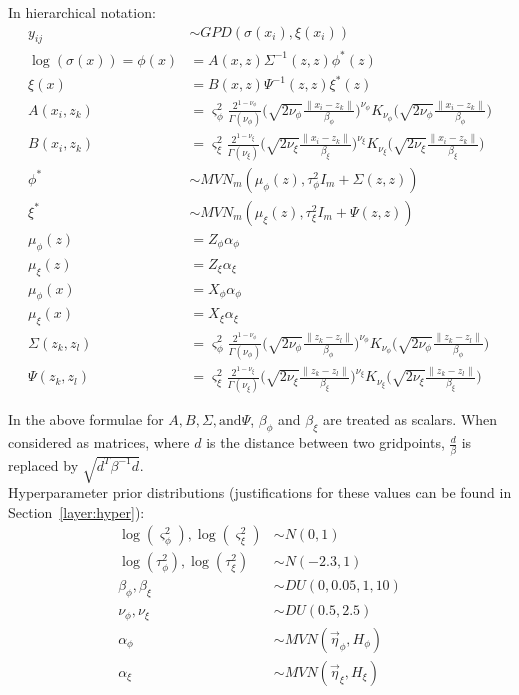 \documentclass{article}
\begin{document}
In hierarchical notation:
\begin{align*}
y_{ij} &\sim GPD(\sigma(x_i), \xi(x_i)) \\
\log (\sigma (x)) = \phi(x) &= A(x, z) \Sigma^{-1}(z,z) \phi^*(z) \\
\xi (x) &= B(x, z) \Psi^{-1}(z,z) \xi^*(z) \\
A(x_i, z_k) &= \varsigma_\phi^2 \frac{2^{1-\nu_\phi}}{\Gamma(\nu_\phi)}\Bigg(\sqrt{2\nu_\phi}\frac{\|x_i - z_k\|}{\beta_\phi}\Bigg)^{\nu_\phi} K_{\nu_\phi}\Bigg(\sqrt{2\nu_\phi}\frac{\|x_i - z_k\|}{\beta_\phi}\Bigg)\\
B(x_i, z_k) &= \varsigma_\xi^2 \frac{2^{1-\nu_\xi}}{\Gamma(\nu_\xi)}\Bigg(\sqrt{2\nu_\xi}\frac{\|x_i - z_k\|}{\beta_\xi}\Bigg)^{\nu_\xi} K_{\nu_\xi}\Bigg(\sqrt{2\nu_\xi}\frac{\|x_i - z_k\|}{\beta_\xi}\Bigg)\\
\phi^* &\sim MVN_m(\mu_\phi(z), \tau_\phi^2 I_m + \Sigma(z, z))\\
\xi^* &\sim MVN_m(\mu_\xi(z), \tau_\xi^2 I_m + \Psi(z, z))\\
\mu_\phi (z) &= Z_\phi \alpha_\phi \\
\mu_\xi (z) &= Z_\xi \alpha_\xi \\
\mu_\phi(x) &= X_\phi \alpha_\phi \\
\mu_\xi(x) &= X_\xi \alpha_\xi \\
\Sigma(z_k, z_l) &= \varsigma_\phi^2 \frac{2^{1-\nu_\phi}}{\Gamma(\nu_\phi)}\Bigg(\sqrt{2\nu_\phi}\frac{\|z_k - z_l\|}{\beta_\phi}\Bigg)^{\nu_\phi} K_{\nu_\phi}\Bigg(\sqrt{2\nu_\phi}\frac{\|z_k - z_l\|}{\beta_\phi}\Bigg)\\
\Psi(z_k, z_l) &= \varsigma_\xi^2 \frac{2^{1-\nu_\xi}}{\Gamma(\nu_\xi)}\Bigg(\sqrt{2\nu_\xi}\frac{\|z_k - z_l\|}{\beta_\xi}\Bigg)^{\nu_\xi} K_{\nu_\xi}\Bigg(\sqrt{2\nu_\xi}\frac{\|z_k - z_l\|}{\beta_\xi}\Bigg)
\end{align*}

In the above formulae for $A, B, \Sigma, \text{and} \Psi$, $\beta_\phi$ and $\beta_\xi$ are treated as scalars. When considered as matrices, where $d$ is the distance between two gridpoints, $\frac{d}{\beta}$ is replaced by $\sqrt{d^T \beta^{-1} d}$.
\\

\clearpage
Hyperparameter prior distributions (justifications for these values can be found in Section~\ref{layer:hyper}):
\begin{align*}
\log(\varsigma^2_\phi), \log(\varsigma^2_\xi)&\sim N(0, 1) \\
\log(\tau^2_\phi), \log(\tau^2_\xi) &\sim N(-2.3, 1) \\
\beta_\phi, \beta_\xi &\sim DU(0, 0.05, 1, 10)\\
\nu_\phi, \nu_\xi &\sim DU(0.5, 2.5)\\
\alpha_\phi &\sim MVN(\vec{\eta}_\phi, H_\phi)\\
\alpha_\xi &\sim MVN(\vec{\eta}_\xi, H_\xi)\\
\end{align*}
\end{document}
